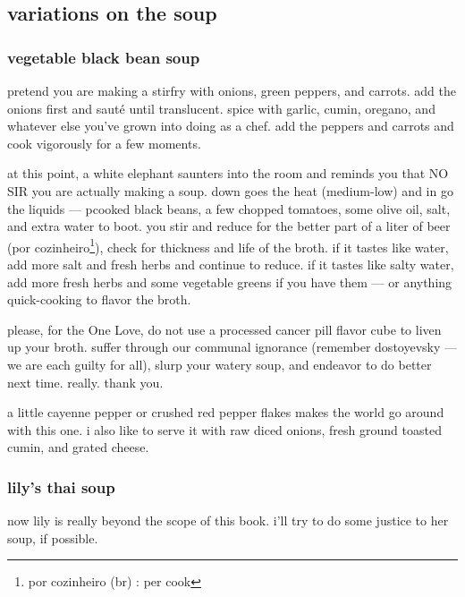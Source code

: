 \subsection{variations on the soup}

\subsubsection{vegetable black bean soup}

pretend you are making a stirfry with onions, green peppers, and
carrots. add the onions first and saut\'{e} until translucent. spice
with garlic, cumin, oregano, and whatever else you've grown into doing
as a chef. add the peppers and carrots and cook vigorously for a few
moments.

at this point, a white elephant saunters into the room and reminds you
that NO SIR you are actually making a soup. down goes the heat
(medium-low) and in go the liquids --- pcooked black beans, a few
chopped tomatoes, some olive oil, salt, and extra water to boot. you
stir and reduce for the better part of a liter of beer (por
cozinheiro\footnote{por cozinheiro (br) : per cook}), check for
thickness and life of the broth. if it tastes like water, add more
salt and fresh herbs and continue to reduce. if it tastes like salty
water, add more fresh herbs and some vegetable greens if you have them
--- or anything quick-cooking to flavor the broth.

please, for the One Love, do not use a processed cancer pill flavor
cube to liven up your broth. suffer through our communal ignorance
(remember dostoyevsky --- we are each guilty for all), slurp your
watery soup, and endeavor to do better next time. really. thank you.

a little cayenne pepper or crushed red pepper flakes makes the world
go around with this one. i also like to serve it with raw diced
onions, fresh ground toasted cumin, and grated cheese.

\subsubsection{lily's thai soup}

now lily is really beyond the scope of this book. i'll try to do some
justice to her soup, if possible.

